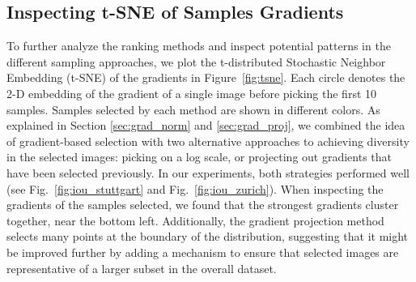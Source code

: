 \documentclass[letterpaper, 10 pt, conference]{ieeeconf}  %
\def\figref#1{Fig.~\ref{#1}}
\newcommand\todo[1]{\textbf{[TODO: #1}]}
\begin{document}
    
    
%
%
%
%


\subsection{Inspecting t-SNE of Samples Gradients}

To further analyze the ranking methods and inspect potential patterns in the different sampling approaches, we plot the t-distributed Stochastic Neighbor Embedding (t-SNE) of the gradients in Figure~\ref{fig:tsne}. Each circle denotes the 2-D embedding of the gradient of a single image before picking the first 10 samples. Samples selected by each method are shown in different colors.
As explained in Section \ref{sec:grad_norm} and \ref{sec:grad_proj}, we combined the idea of gradient-based selection with two alternative approaches to achieving diversity in the selected images: picking on a log scale, or projecting out gradients that have been selected previously. In our experiments, both strategies performed well (see \figref{fig:iou_stuttgart} and \figref{fig:iou_zurich}). 
When inspecting the gradients of the samples selected, we found that the strongest gradients cluster together, near the bottom left. Additionally, the gradient projection method selects many points at the boundary of the distribution, suggesting that it might be improved further by adding a mechanism to ensure that selected images are representative of a larger subset in the overall dataset.
\end{document}
